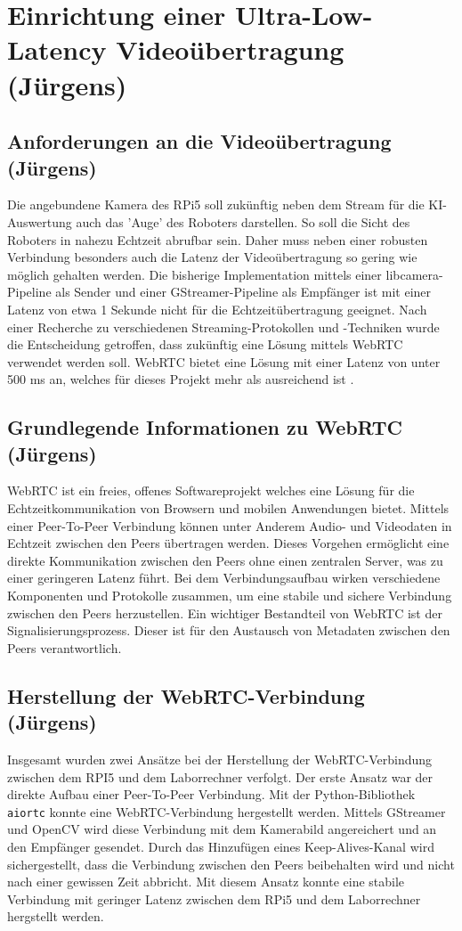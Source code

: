 \chapter{Einrichtung einer Ultra-Low-Latency Videoübertragung (Jürgens)}
\section{Anforderungen an die Videoübertragung (Jürgens)}
Die angebundene Kamera des RPi5 soll zukünftig neben dem Stream für die KI-Auswertung auch das 'Auge' des Roboters darstellen. So soll die Sicht des Roboters in nahezu Echtzeit abrufbar sein. Daher muss neben einer robusten Verbindung besonders auch die Latenz der Videoübertragung so gering wie möglich gehalten werden. Die bisherige Implementation mittels einer libcamera-Pipeline als Sender und einer GStreamer-Pipeline als Empfänger ist mit einer Latenz von etwa 1 Sekunde nicht für die Echtzeitübertragung geeignet. Nach einer Recherche zu verschiedenen Streaming-Protokollen und -Techniken wurde die Entscheidung getroffen, dass zukünftig eine Lösung mittels WebRTC verwendet werden soll. WebRTC bietet eine Lösung mit einer Latenz von unter 500 ms an, welches für dieses Projekt mehr als ausreichend ist \cite{WebRTCLatency}.

\section{Grundlegende Informationen zu WebRTC (Jürgens)}
WebRTC ist ein freies, offenes Softwareprojekt welches eine Lösung für die Echtzeitkommunikation von Browsern und mobilen Anwendungen bietet. Mittels einer Peer-To-Peer Verbindung können unter Anderem Audio- und Videodaten in Echtzeit zwischen den Peers übertragen werden. Dieses Vorgehen ermöglicht eine direkte Kommunikation zwischen den Peers ohne einen zentralen Server, was zu einer geringeren Latenz führt.
Bei dem Verbindungsaufbau wirken verschiedene Komponenten und Protokolle zusammen, um eine stabile und sichere Verbindung zwischen den Peers herzustellen. Ein wichtiger Bestandteil von WebRTC ist der Signalisierungsprozess. Dieser ist für den Austausch von Metadaten zwischen den Peers verantwortlich. \cite{WebRTCBasics}

\section{Herstellung der WebRTC-Verbindung (Jürgens)}
Insgesamt wurden zwei Ansätze bei der Herstellung der WebRTC-Verbindung zwischen dem RPI5 und dem Laborrechner verfolgt. Der erste Ansatz war der direkte Aufbau einer Peer-To-Peer Verbindung.
Mit der Python-Bibliothek \texttt{aiortc} konnte eine WebRTC-Verbindung hergestellt werden. Mittels GStreamer und OpenCV wird diese Verbindung mit dem Kamerabild angereichert und an den Empfänger gesendet. Durch das Hinzufügen eines Keep-Alives-Kanal wird sichergestellt, dass die Verbindung zwischen den Peers beibehalten wird und nicht nach einer gewissen Zeit abbricht. Mit diesem Ansatz konnte eine stabile Verbindung mit geringer Latenz zwischen dem RPi5 und dem Laborrechner hergstellt werden.

